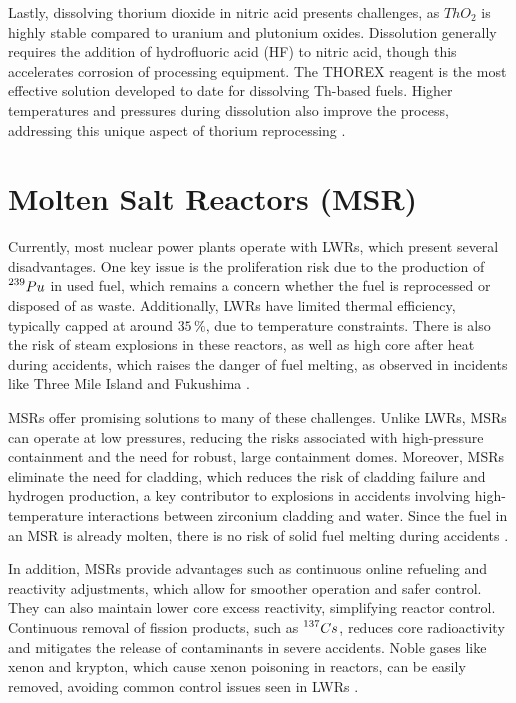 Lastly, dissolving thorium dioxide in nitric acid presents challenges, as \(ThO_2\) is highly stable compared to uranium and plutonium oxides. Dissolution generally requires the addition of hydrofluoric acid (HF) to nitric acid, though this accelerates corrosion of processing equipment. The THOREX reagent is the most effective solution developed to date for dissolving Th-based fuels. Higher temperatures and pressures during dissolution also improve the process, addressing this unique aspect of thorium reprocessing \cite{IAEA_Th_Potential}.

\section{Molten Salt Reactors (MSR)}

Currently, most nuclear power plants operate with LWRs, which present several disadvantages. One key issue is the proliferation risk due to the production of \(\prescript{239}{}{Pu}\) in used fuel, which remains a concern whether the fuel is reprocessed or disposed of as waste. Additionally, LWRs have limited thermal efficiency, typically capped at around \(35\,\%\), due to temperature constraints. There is also the risk of steam explosions in these reactors, as well as high core after heat during accidents, which raises the danger of fuel melting, as observed in incidents like Three Mile Island and Fukushima \cite{TMSR_book}.

MSRs offer promising solutions to many of these challenges. Unlike LWRs, MSRs can operate at low pressures, reducing the risks associated with high-pressure containment and the need for robust, large containment domes. Moreover, MSRs eliminate the need for cladding, which reduces the risk of cladding failure and hydrogen production, a key contributor to explosions in accidents involving high-temperature interactions between zirconium cladding and water. Since the fuel in an MSR is already molten, there is no risk of solid fuel melting during accidents \cite{TMSR_book}.

In addition, MSRs provide advantages such as continuous online refueling and reactivity adjustments, which allow for smoother operation and safer control. They can also maintain lower core excess reactivity, simplifying reactor control. Continuous removal of fission products, such as \(\prescript{137}{}{Cs}\), reduces core radioactivity and mitigates the release of contaminants in severe accidents. Noble gases like xenon and krypton, which cause xenon poisoning in reactors, can be easily removed, avoiding common control issues seen in LWRs \cite{TMSR_book}.

